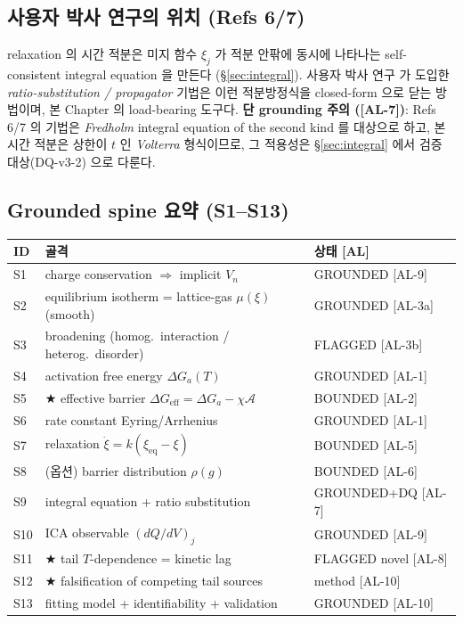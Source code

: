\documentclass[11pt,a4paper]{article}
\newcommand{\eff}{\mathrm{eff}}
\newcommand{\eq}{\mathrm{eq}}
\newcommand{\AL}[1]{\textsf{[AL-#1]}}
\begin{document}
\subsection{사용자 박사 연구의 위치 (Refs 6/7)}\label{sec:phd}
relaxation 의 시간 적분은 미지 함수 $\xi_j$ 가 적분 안팎에 동시에 나타나는
self-consistent integral equation 을 만든다 (\S\ref{sec:integral}). 사용자 박사 연구
\cite{lee2011,son2013} 가 도입한 \emph{ratio-substitution / propagator} 기법은 이런
적분방정식을 closed-form 으로 닫는 방법이며, 본 Chapter 의 load-bearing 도구다.
\textbf{단 grounding 주의 (\AL{7})}: Refs 6/7 의 기법은 \emph{Fredholm} integral
equation of the second kind 를 대상으로 하고, 본 시간 적분은 상한이 $t$ 인
\emph{Volterra} 형식이므로, 그 적용성은 \S\ref{sec:integral} 에서 검증 대상(DQ-v3-2)
으로 다룬다.

\subsection{Grounded spine 요약 (S1--S13)}\label{sec:spine}
\begin{longtable}{p{} p{} p{}}
\toprule
ID & 골격 & 상태 [AL] \\ \midrule \endhead
S1 & charge conservation $\Rightarrow$ implicit $V_n$ & GROUNDED \AL{9} \\
S2 & equilibrium isotherm = lattice-gas $\mu(\xi)$ (smooth) & GROUNDED \AL{3a} \\
S3 & broadening (homog.\ interaction / heterog.\ disorder) & FLAGGED \AL{3b} \\
S4 & activation free energy $\Delta G_a(T)$ & GROUNDED \AL{1} \\
S5 & ★ effective barrier $\Delta G_\eff = \Delta G_a-\chi\mathcal A$ & BOUNDED \AL{2} \\
S6 & rate constant Eyring/Arrhenius & GROUNDED \AL{1} \\
S7 & relaxation $\dot\xi = k(\xi_\eq-\xi)$ & BOUNDED \AL{5} \\
S8 & (옵션) barrier distribution $\rho(g)$ & BOUNDED \AL{6} \\
S9 & integral equation + ratio substitution & GROUNDED+DQ \AL{7} \\
S10 & ICA observable $(dQ/dV)_j$ & GROUNDED \AL{9} \\
S11 & ★ tail $T$-dependence = kinetic lag & FLAGGED novel \AL{8} \\
S12 & ★ falsification of competing tail sources & method \AL{10} \\
S13 & fitting model + identifiability + validation & GROUNDED \AL{10} \\
\bottomrule
\end{longtable}
\end{document}
